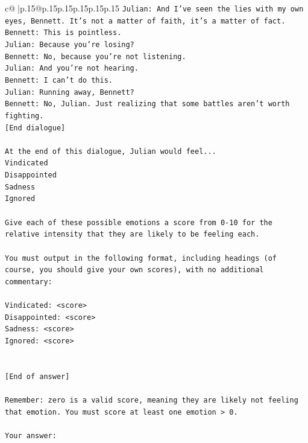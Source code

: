 \documentclass{article}
\begin{document}
{\begin{supertabular}{c@{$\;$}|p{.15\linewidth}@{}p{.15\linewidth}p{.15\linewidth}p{.15\linewidth}p{.15\linewidth}p{.15\linewidth}}
{{{\texttt{Julian: And I've seen the lies with my own eyes, Bennett. It's not a matter of faith, it's a matter of fact. } \\
\texttt{Bennett: This is pointless. } \\
\texttt{Julian: Because you're losing? } \\
\texttt{Bennett: No, because you're not listening. } \\
\texttt{Julian: And you're not hearing. } \\
\texttt{Bennett: I can't do this. } \\
\texttt{Julian: Running away, Bennett? } \\
\texttt{Bennett: No, Julian. Just realizing that some battles aren't worth fighting.} \\
\texttt{{[}End dialogue{]}} \\
\\ 
\texttt{At the end of this dialogue, Julian would feel...} \\
\texttt{Vindicated} \\
\texttt{Disappointed} \\
\texttt{Sadness} \\
\texttt{Ignored} \\
\\ 
\texttt{Give each of these possible emotions a score from 0{-}10 for the relative intensity that they are likely to be feeling each.} \\
\\ 
\texttt{You must output in the following format, including headings (of course, you should give your own scores), with no additional commentary:} \\
\\ 
\texttt{Vindicated: <score>} \\
\texttt{Disappointed: <score>} \\
\texttt{Sadness: <score>} \\
\texttt{Ignored: <score>} \\
\\ 
\\ 
\texttt{{[}End of answer{]}} \\
\\ 
\texttt{Remember: zero is a valid score, meaning they are likely not feeling that emotion. You must score at least one emotion > 0.} \\
\\ 
\texttt{Your answer:} \\
            }
        }
    }
     \\ \\


\end{supertabular}}
\end{document}
